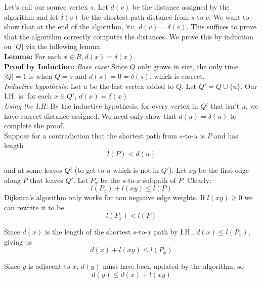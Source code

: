 \documentclass[12pt, a4paper]{article}
\begin{document}
Let's call our source vertex $s$. Let $d(v)$ be the distance assigned by the algorithm and let $\delta(v)$ be the shortest path distance from $s$-to-$v$. We want to show that at the end of the algorithm, $\forall v,\ d(v) = \delta(v)$. This suffices to prove that the algorithm correctly computes the distances. We prove this by induction on $|Q|$ via the following lemma:\\

\noindent
\textbf{Lemma:} For each $x \in R, d(x) = \delta(x)$.
\\

\noindent
\textbf{Proof by Induction:}
\textit{Base case:} Since $Q$ only grows in size, the only time $|Q| = 1$ is when $Q = {s}$ and $d(s) = 0 = \delta(s)$, which is correct.
\\

\noindent
\textit{Inductive hypothesis:} Let $u$ be the last vertex added to $Q$. Let $Q'= Q \cup \{u\}$. Our I.H. is: for each $x \in Q'$, $d(x) = \delta(x)$
\\

\noindent
\textit{Using the I.H:} By the inductive hypothesis, for every vertex in $Q'$ that isn't $u$, we have correct distance assigned. We need only show that $d(u) = \delta(u)$ to complete the proof. \\

\noindent
Suppose for a contradiction that the shortest path from $s$-to-$u$ is $P$ and has length
\begin{equation}
    l(P) < d(u)
    \label{equation:proof-1}
\end{equation}

and at some leaves $Q'$ (to get to $u$ which is not in $Q'$). Let $xy$ be the first edge along $P$ that leaves $Q'$. Let $P_x$ be the $s$-to-$x$ subpath of $P$. Clearly:
$$l(P_x) + l(xy) \leq l(P)$$
Dijkstra's algorithm only works for non negative edge weights. If $l(xy) \geq 0$ we can rewrite it to be
\begin{equation}
    l(P_x) < l(P)
    \label{equation:proof-2}
\end{equation}

Since $d(x)$ is the length of the shortest $s$-to-$x$ path by I.H., $d(x) \leq l(P_x)$, giving us
\begin{equation}
    d(x) + l(xy) \leq l(P_x)
    \label{equation:proof-3}
\end{equation}

Since $y$ is adjacent to $x$, $d(y)$ must have been updated by the algorithm, so
\begin{equation}
    d(y) \leq d(x) + l(xy)
    \label{equation:proof-4}
\end{equation}
\end{document}
